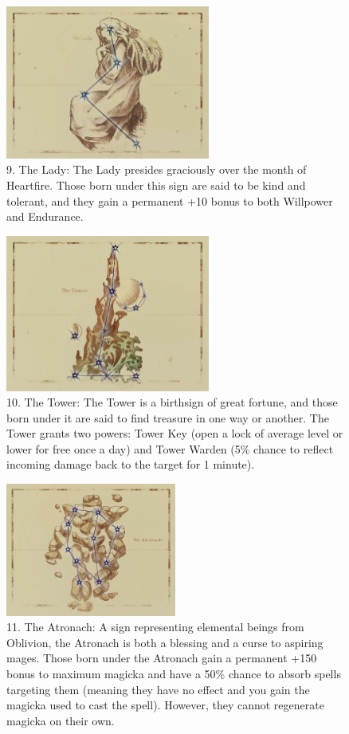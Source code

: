 \documentclass[12pt]{book}
\begin{document}
\begin{figure}[H]
\includegraphics[width=0.6\textwidth]{Lady.png}
\centering
\caption*{9. The Lady: The Lady presides graciously over the month of Heartfire. Those born under this sign are said to be kind and tolerant, and they gain a permanent +10 bonus to both Willpower and Endurance.}
\end{figure}

\begin{figure}[H]
\includegraphics[width=0.6\textwidth]{Tower.png}
\centering
\caption*{10. The Tower: The Tower is a birthsign of great fortune, and those born under it are said to find treasure in one way or another. The Tower grants two powers: Tower Key (open a lock of average level or lower for free once a day) and Tower Warden (5\% chance to reflect incoming damage back to the target for 1 minute).}
\end{figure}

\begin{figure}[H]
\includegraphics[width=0.5\textwidth]{Atronach.png}
\centering
\caption*{11. The Atronach: A sign representing elemental beings from Oblivion, the Atronach is both a blessing and a curse to aspiring mages. Those born under the Atronach gain a permanent +150 bonus to maximum magicka and have a 50\% chance to absorb spells targeting them (meaning they have no effect and you gain the magicka used to cast the spell). However, they cannot regenerate magicka on their own.}
\end{figure}
\end{document}
